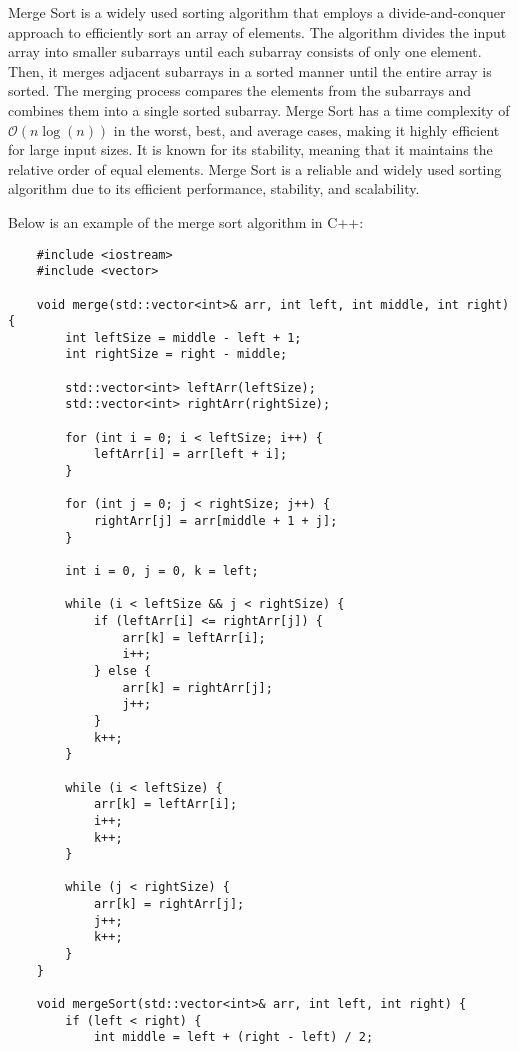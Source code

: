 Merge Sort is a widely used sorting algorithm that employs a divide-and-conquer approach to efficiently sort an array of elements. The algorithm divides the input array into smaller subarrays until each subarray consists of only one element. Then, it merges adjacent subarrays in a sorted manner until the entire array is sorted. The merging process 
compares the elements from the subarrays and combines them into a single sorted subarray. Merge Sort has a time complexity of 
$\mathcal{O}(n\log{(n)})$ in the worst, best, and average cases, making it highly efficient for large input sizes. It is known for its stability, meaning that it maintains the relative order of equal elements. Merge Sort is a reliable and widely used sorting algorithm due to its efficient performance, stability, and scalability.

\begin{solution}
    Below is an example of the merge sort algorithm in C++:

    \horizontalline

    \begin{verbatim}
    #include <iostream>
    #include <vector>
    
    void merge(std::vector<int>& arr, int left, int middle, int right) {
        int leftSize = middle - left + 1;
        int rightSize = right - middle;
    
        std::vector<int> leftArr(leftSize);
        std::vector<int> rightArr(rightSize);
    
        for (int i = 0; i < leftSize; i++) {
            leftArr[i] = arr[left + i];
        }
    
        for (int j = 0; j < rightSize; j++) {
            rightArr[j] = arr[middle + 1 + j];
        }
    
        int i = 0, j = 0, k = left;
    
        while (i < leftSize && j < rightSize) {
            if (leftArr[i] <= rightArr[j]) {
                arr[k] = leftArr[i];
                i++;
            } else {
                arr[k] = rightArr[j];
                j++;
            }
            k++;
        }
    
        while (i < leftSize) {
            arr[k] = leftArr[i];
            i++;
            k++;
        }
    
        while (j < rightSize) {
            arr[k] = rightArr[j];
            j++;
            k++;
        }
    }
    
    void mergeSort(std::vector<int>& arr, int left, int right) {
        if (left < right) {
            int middle = left + (right - left) / 2;
    

\end{verbatim}
\end{solution}
